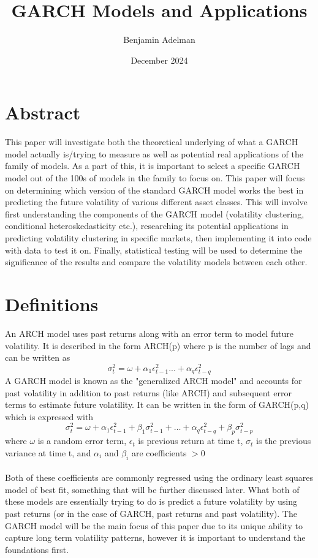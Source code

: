 \documentclass{article}
\title{GARCH Models and Applications}
\author{Benjamin Adelman}
\date{December 2024}
\begin{document}
\maketitle

\section{Abstract}
This paper will investigate both the theoretical underlying of what a GARCH model actually is/trying to measure as well as potential real applications of the family of models. As a part of this, it is important to select a specific GARCH model out of the 100s of models in the family to focus on. This paper will focus on determining which version of the standard GARCH model works the best in predicting the future volatility of various different asset classes. This will involve first understanding the components of the GARCH model (volatility clustering, conditional heteroskedasticity etc.), researching its potential applications in predicting volatility clustering in specific markets, then implementing it into code with data to test it on. Finally, statistical testing will be used to determine the significance of the results and compare the volatility models between each other.
\section{Definitions}
An ARCH model uses past returns along with an error term to model future volatility. It is described in the form ARCH(p) where p is the number of lags and can be written as $$\sigma^2_t = \omega + \alpha_1\epsilon^2_{t-1} ... + \alpha_q \epsilon^2_{t-q}$$
A GARCH model is known as the "generalized ARCH model" and accounts for past volatility in addition to past returns (like ARCH) and subsequent error terms to estimate future volatility. It can be written in the form  of GARCH(p,q) which is expressed with $$\sigma^2_t = \omega + \alpha_1 \epsilon^2_{t-1} +\beta_1 \sigma^2_{t-1} + … + \alpha_q \epsilon_{t-q}^2 + \beta_p \sigma^2_{t-p}$$
where $\omega$ is a random error term, $\epsilon_t$ is previous return at time t, $\sigma_t$ is the previous variance at time t, and $\alpha_i$ and $\beta_i$ are coefficients $>0$ \\
\\
Both of these coefficients are commonly regressed using the ordinary least squares model of best fit, something that will be further discussed later. What both of these models are essentially trying to do is predict a future volatility by using past returns (or in the case of GARCH, past returns and past volatility). The GARCH model will be the main focus of this paper due to its unique ability to capture long term volatility patterns, however it is important to understand the foundations first.
\end{document}
